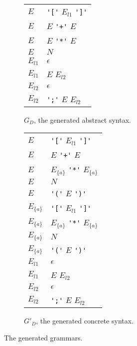 \documentclass[acmsmall,review,anonymous]{acmart}\settopmatter{printfolios=true,printccs=false,printacmref=false}
\begin{document}
\begin{figure}
  \begin{subfigure}[t]{.45\linewidth}
    \centering
    \begin{tabular}{@{}l@{\quad$->$\quad}l@{}}
      \toprule
      $E$ & \verb|'['| $E_{l1}$ \verb|']'| \\
      $E$ & $E$ \verb|'+'| $E$ \\
      $E$ & $E$ \verb|'*'| $E$ \\
      $E$ & $N$ \\
      \midrule
      $E_{l1}$ & $\epsilon$ \\
      $E_{l1}$ & $E$ $E_{l2}$ \\
      \midrule
      $E_{l2}$ & $\epsilon$ \\
      $E_{l2}$ & \verb|';'| $E$ $E_{l2}$ \\
      \bottomrule
    \end{tabular}
    \caption{$G_D$, the generated abstract syntax.}
    \label{fig:running-example-generated:w}
  \end{subfigure}%
%
  \begin{subfigure}[t]{.45\linewidth}
    \centering
    \begin{tabular}{@{}l@{\quad$->$\quad}l@{}}
      \toprule
      $E$ & \verb|'['| $E_{l1}$ \verb|']'| \\
      $E$ & $E$ \verb|'+'| $E$ \\
      $E$ & $E_{\{a\}}$ \verb|'*'| $E_{\{a\}}$ \\
      $E$ & $N$ \\
      $E$ & \verb|'('| $E$ \verb|')'| \\
      \midrule
      $E_{\{a\}}$ & \verb|'['| $E_{l1}$ \verb|']'| \\
      $E_{\{a\}}$ & $E_{\{a\}}$ \verb|'*'| $E_{\{a\}}$ \\
      $E_{\{a\}}$ & $N$ \\
      $E_{\{a\}}$ & \verb|'('| $E$ \verb|')'| \\
      \midrule
      $E_{l1}$ & $\epsilon$ \\
      $E_{l1}$ & $E$ $E_{l2}$ \\
      \midrule
      $E_{l2}$ & $\epsilon$ \\
      $E_{l2}$ & \verb|';'| $E$ $E_{l2}$ \\
      \bottomrule
    \end{tabular}
    \caption{$G'_D$, the generated concrete syntax.}
    \label{fig:running-example-generated:w-prime}
  \end{subfigure}
  \caption{The generated grammars.}
  \label{fig:running-example-generated}
\end{figure}
\end{document}

